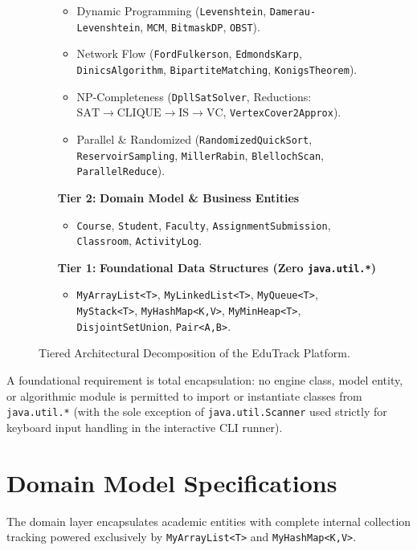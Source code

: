 \begin{figure}[H]
\begin{tcolorbox}[colback=codebackground,colframe=primaryblue,title=\textbf{EduTrack Layered Architectural Topology}]
\begin{enumerate}[leftmargin=1.5cm]
\begin{itemize}
        \item Dynamic Programming (\texttt{Levenshtein}, \texttt{Damerau-Levenshtein}, \texttt{MCM}, \texttt{BitmaskDP}, \texttt{OBST}).
        \item Network Flow (\texttt{FordFulkerson}, \texttt{EdmondsKarp}, \texttt{DinicsAlgorithm}, \texttt{BipartiteMatching}, \texttt{KonigsTheorem}).
        \item NP-Completeness (\texttt{DpllSatSolver}, Reductions: $\text{SAT} \to \text{CLIQUE} \to \text{IS} \to \text{VC}$, \texttt{VertexCover2Approx}).
        \item Parallel \& Randomized (\texttt{RandomizedQuickSort}, \texttt{ReservoirSampling}, \texttt{MillerRabin}, \texttt{BlellochScan}, \texttt{ParallelReduce}).
    \end{itemize}
    \item[\textbf{Tier 2:}] \textbf{Domain Model \& Business Entities}
    \begin{itemize}
        \item \texttt{Course}, \texttt{Student}, \texttt{Faculty}, \texttt{AssignmentSubmission}, \texttt{Classroom}, \texttt{ActivityLog}.
    \end{itemize}
    \item[\textbf{Tier 1:}] \textbf{Foundational Data Structures (Zero \texttt{java.util.*})}
    \begin{itemize}
        \item \texttt{MyArrayList<T>}, \texttt{MyLinkedList<T>}, \texttt{MyQueue<T>}, \texttt{MyStack<T>}, \texttt{MyHashMap<K,V>}, \texttt{MyMinHeap<T>}, \texttt{DisjointSetUnion}, \texttt{Pair<A,B>}.
    \end{itemize}
\end{enumerate}
\end{tcolorbox}
\caption{Tiered Architectural Decomposition of the EduTrack Platform.}
\label{fig:system_layers}
\end{figure}

A foundational requirement is total encapsulation: no engine class, model entity, or algorithmic module is permitted to import or instantiate classes from \texttt{java.util.*} (with the sole exception of \texttt{java.util.Scanner} used strictly for keyboard input handling in the interactive CLI runner).

\section{Domain Model Specifications}
The domain layer encapsulates academic entities with complete internal collection tracking powered exclusively by \texttt{MyArrayList<T>} and \texttt{MyHashMap<K,V>}.

